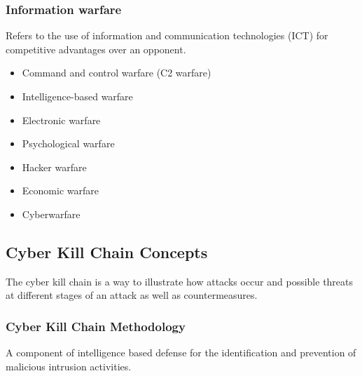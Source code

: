 \subsubsection{Information warfare}
Refers to the use of information and communication technologies (ICT) for competitive advantages over an opponent.
\begin{itemize}
    \item Command and control warfare (C2 warfare)
    \item Intelligence-based warfare
    \item Electronic warfare
    \item Psychological warfare
    \item Hacker warfare
    \item Economic warfare
    \item Cyberwarfare
\end{itemize}

\subsection{Cyber Kill Chain Concepts}
The cyber kill chain is a way to illustrate how attacks occur and possible threats at different stages of an attack as well as countermeasures.

\subsubsection{Cyber Kill Chain Methodology}
A component of intelligence based defense for the identification and prevention of malicious intrusion activities.

